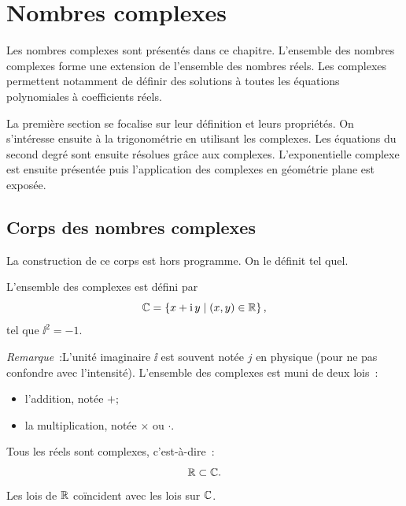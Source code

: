 \chapter{Nombres complexes}\label{chap:complexes}
\minitoc%
\minilof%
\minilot%

Les nombres complexes sont présentés dans ce chapitre. L'ensemble des nombres
complexes forme une extension de l'ensemble des nombres réels. Les complexes
permettent notamment de définir des solutions à toutes les équations
polynomiales à coefficients réels.

La première section se focalise sur leur définition et leurs propriétés. On
s'intéresse ensuite à la trigonométrie en utilisant les complexes. Les équations
du second degré sont ensuite résolues grâce aux complexes. L'exponentielle
complexe est ensuite présentée puis l'application des complexes en géométrie
plane est exposée.

\section{Corps des nombres complexes}\label{sec:corpsdescomplexes}

La construction de ce corps est hors programme. On le définit tel quel.

\begin{defdef}
  L'ensemble des complexes est défini par
  \begin{equation}
    \mathbb{C} = \left\{x+ \operatorname{i}{}y\mathrel{}\middle|\mathrel{}(x,y)\in{}\mathbb{R}\right\},
  \end{equation}
  tel que \(\ii^2 = -1\).
\end{defdef}

\emph{Remarque}~:L'unité imaginaire \(\ii\) est souvent notée \(j\) en physique
(pour ne pas confondre avec l'intensité). L'ensemble des complexes est muni de
deux lois~:
\begin{itemize}
  \item l'addition, notée \( + \);
  \item la multiplication, notée \(\times\) ou \(\cdot\).
\end{itemize}

\begin{prop}
  Tous les réels sont complexes, c'est-à-dire~:
  \begin{equation}
    \mathbb{R}\subset{}\mathbb{C}.
  \end{equation}
  Les lois de \(\mathbb{R}\) coïncident avec les lois sur \(\mathbb{C}\).
\end{prop}

